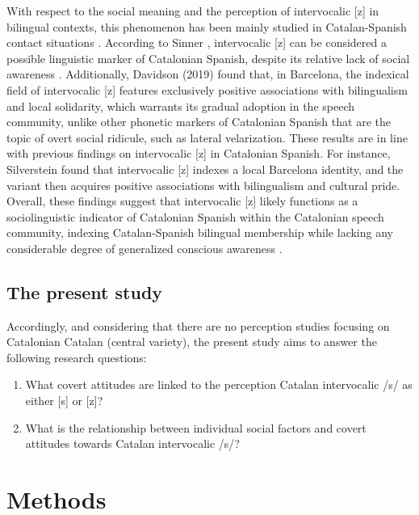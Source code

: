 \documentclass[
  a4paper,
  11pt,
  twocolumn]{article}
\begin{document}
With respect to the social meaning and the perception of intervocalic
{[}z{]} in bilingual contexts, this phenomenon has been mainly studied
in Catalan-Spanish contact situations \cite{davidson_2014}
\cite{davidson_2015}. According to Sinner \cite{sinner_2002},
intervocalic {[}z{]} can be considered a possible linguistic marker of
Catalonian Spanish, despite its relative lack of social awareness
\cite{davidson_2019} \cite{sinner_2002}. Additionally, Davidson (2019)
found that, in Barcelona, the indexical field of intervocalic {[}z{]}
features exclusively positive associations with bilingualism and local
solidarity, which warrants its gradual adoption in the speech community,
unlike other phonetic markers of Catalonian Spanish that are the topic
of overt social ridicule, such as lateral velarization. These results
are in line with previous findings on intervocalic {[}z{]} in Catalonian
Spanish. For instance, Silverstein \cite{silverstein_2003} found that
intervocalic {[}z{]} indexes a local Barcelona identity, and the variant
then acquires positive associations with bilingualism and cultural
pride. Overall, these findings suggest that intervocalic {[}z{]} likely
functions as a sociolinguistic indicator of Catalonian Spanish within
the Catalonian speech community, indexing Catalan-Spanish bilingual
membership while lacking any considerable degree of generalized
conscious awareness \cite{davidson_2019}.

\subsection{The present study}

Accordingly, and considering that there are no perception studies
focusing on Catalonian Catalan (central variety), the present study aims
to answer the following research questions:

\begin{enumerate}
\def\labelenumi{\arabic{enumi}.}
\item
  What covert attitudes are linked to the perception Catalan
  intervocalic /s/ as either {[}s{]} or {[}z{]}?
\item
  What is the relationship between individual social factors and covert
  attitudes towards Catalan intervocalic /s/?
\end{enumerate}

\section{Methods}
\end{document}

